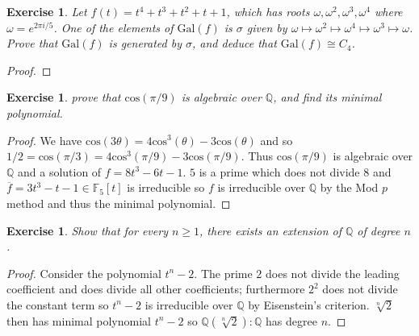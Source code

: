\documentclass{article}
\newtheorem{exercise}[theorem]{Exercise}
\begin{document}
\begin{exercise}
Let $f(t)=t^4+t^3+t^2+t+1$, which has roots $\omega,\omega^2,\omega^3,\omega^4$ where $\omega=e^{2\pi i/5}$. One of the elements of $\text{Gal}(f)$ is $\sigma$ given by $\omega\mapsto\omega^2\mapsto\omega^4\mapsto\omega^3\mapsto\omega$. Prove that $\text{Gal}(f)$ is generated by $\sigma$, and deduce that $\text{Gal}(f)\cong C_4$.
\end{exercise}
\begin{proof}

\end{proof}

\begin{exercise}
prove that $\text{cos}(\pi/9)$ is algebraic over $\mathbb{Q}$, and find its minimal polynomial.
\end{exercise}
\begin{proof}
We have $\text{cos}(3\theta)=4\text{cos}^3(\theta)-3\text{cos}(\theta)$ and so $1/2=\text{cos}(\pi/3)=4\text{cos}^3(\pi/9)-3\text{cos}(\pi/9)$. Thus $\text{cos}(\pi/9)$ is algebraic over $\mathbb{Q}$ and a solution of $f=8t^3-6t-1$. $5$ is a prime which does not divide $8$ and $\overline{f}=3t^3-t-1\in\mathbb{F}_5[t]$ is irreducible so $f$ is irreducible over $\mathbb{Q}$ by the Mod $p$ method and thus the minimal polynomial.
\end{proof}

\begin{exercise}
Show that for every $n\geq1$, there exists an extension of $\mathbb{Q}$ of degree $n$.
\end{exercise}
\begin{proof}
Consider the polynomial $t^n-2$. The prime $2$ does not divide the leading coefficient and does divide all other coefficients; furthermore $2^2$ does not divide the constant term so $t^n-2$ is irreducible over $\mathbb{Q}$ by Eisenstein's criterion. $\sqrt[n]{2}$ then has minimal polynomial $t^n-2$ so $\mathbb{Q}(\sqrt[n]{2}):\mathbb{Q}$ has degree $n$.
\end{proof}
\end{document}
